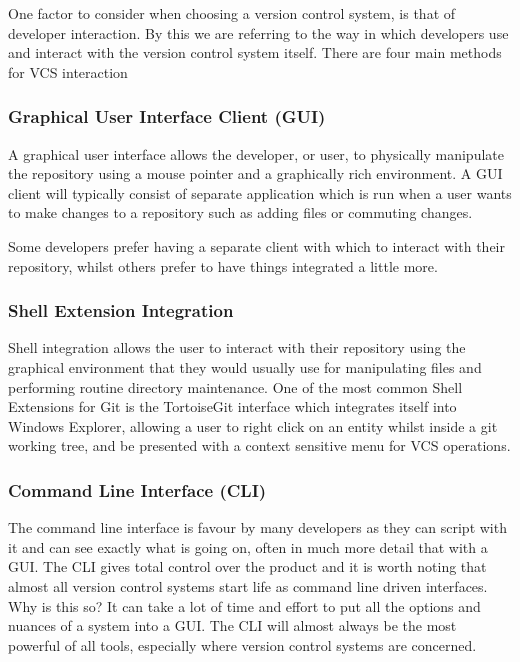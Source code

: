 One factor to consider when choosing a version control system, is that of developer interaction.  By this we are referring to the way in which developers use and interact with the version control system itself.  There are four main methods for VCS interaction

\subsubsection*{Graphical User Interface Client (GUI)}

A graphical user interface allows the developer, or user, to physically manipulate the repository using a mouse pointer and a graphically rich environment.  A GUI client will typically consist of separate application which is run when a user wants to make changes to a repository such as adding files or commuting changes.  

Some developers prefer having a separate client with which to interact with their repository, whilst others prefer to have things integrated a little more.

\subsubsection*{Shell Extension Integration}

Shell integration allows the user to interact with their repository using the graphical environment that they would usually use for manipulating files and performing routine directory maintenance.  One of the most common Shell Extensions for Git is the TortoiseGit interface which integrates itself into Windows Explorer, allowing a user to right click on an entity whilst inside a git working tree, and be presented with a context sensitive menu for VCS operations.

\subsubsection{Command Line Interface (CLI)}

The command line interface is favour by many developers as they can script with it and can see exactly what is going on, often in much more detail that with a GUI.  The CLI gives total control over the product and it is worth noting that almost all version control systems start life as command line driven interfaces.  Why is this so?  It can take a lot of time and effort to put all the options and nuances of a system into a GUI.  The CLI will almost always be the most powerful of all tools, especially where version control systems are concerned.

